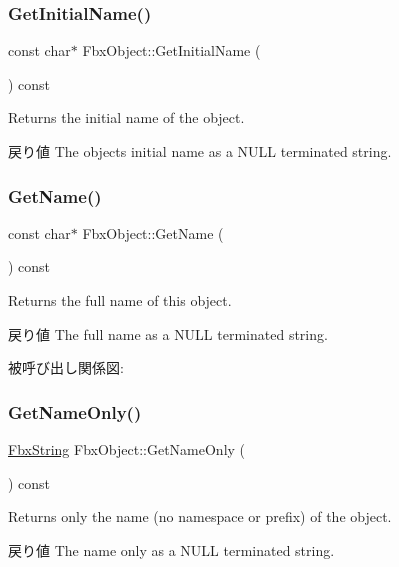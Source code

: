 \subsubsection{\texorpdfstring{Get\+Initial\+Name()}{GetInitialName()}}
{\footnotesize\ttfamily const char$\ast$ Fbx\+Object\+::\+Get\+Initial\+Name (\begin{DoxyParamCaption}{ }\end{DoxyParamCaption}) const}

Returns the initial name of the object. \begin{DoxyReturn}{戻り値}
The object\textquotesingle{}s initial name as a {\ttfamily N\+U\+LL} terminated string. 
\end{DoxyReturn}
\mbox{\label{class_fbx_object_adb6c3656e49af96b64020991b5406ce2}} 
\subsubsection{\texorpdfstring{Get\+Name()}{GetName()}}
{\footnotesize\ttfamily const char$\ast$ Fbx\+Object\+::\+Get\+Name (\begin{DoxyParamCaption}{ }\end{DoxyParamCaption}) const}

Returns the full name of this object. \begin{DoxyReturn}{戻り値}
The full name as a {\ttfamily N\+U\+LL} terminated string. 
\end{DoxyReturn}
被呼び出し関係図\+:
\mbox{\label{class_fbx_object_a3a01a4d055e558d322016ce8d7337329}} 
\subsubsection{\texorpdfstring{Get\+Name\+Only()}{GetNameOnly()}}
{\footnotesize\ttfamily \hyperlink{class_fbx_string}{Fbx\+String} Fbx\+Object\+::\+Get\+Name\+Only (\begin{DoxyParamCaption}{ }\end{DoxyParamCaption}) const}

Returns only the name (no namespace or prefix) of the object. \begin{DoxyReturn}{戻り値}
The name only as a {\ttfamily N\+U\+LL} terminated string. 
\end{DoxyReturn}
\mbox{\label{class_fbx_object_a2367b010ddd5ca21b37b5c7ddff0e781}} 

